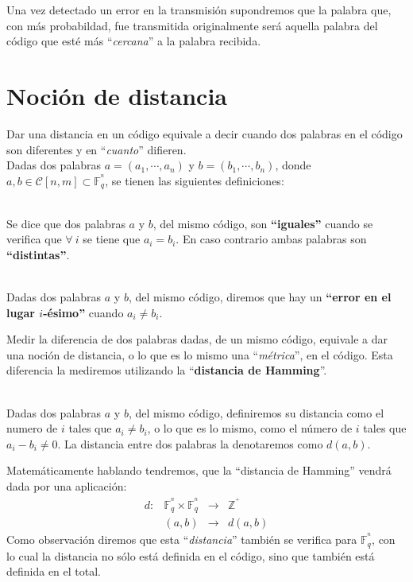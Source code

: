 Una vez detectado un error en la transmisi\'on supondremos que la palabra que,
con m\'as probabildad, fue transmitida originalmente ser\'a aquella palabra del
c\'odigo que est\'e m\'as ``\emph{cercana}'' a la palabra recibida.

%
%

\section{Noci\'on de distancia}

Dar una distancia en un c\'odigo equivale a decir cuando dos palabras en el
c\'odigo son diferentes y en ``\emph{cuanto}'' difieren.\\

Dadas dos palabras $a=(a_1,\cdots,a_n)$ y $b=(b_1,\cdots,b_n)$, donde $a,b
\in \mathcal{C}[n,m]\subset \mathbb{F}^{^n}_q$, se tienen las siguientes
definiciones:
\begin{definicion}
\ \\
Se dice que dos palabras $a$ y $b$, del mismo c\'odigo, son \textbf{``iguales''}
cuando se verifica que $\forall \ i$ se tiene que $a_i=b_i$. En caso contrario
ambas palabras son \textbf{``distintas''}.
\end{definicion}

\begin{definicion}
\ \\
Dadas dos palabras $a$ y $b$, del mismo c\'odigo, diremos que hay un
\textbf{``error en el lugar $i$-\'esimo''} cuando $a_i\neq b_i$.
\end{definicion}
Medir la diferencia de dos palabras dadas, de un mismo c\'odigo, equivale a
dar una noci\'on de distancia, o lo que es lo mismo una ``\emph{m\'etrica}'',
en el c\'odigo. Esta diferencia la mediremos utilizando la ``\textbf{distancia
de Hamming}''.
\begin{definicion}
\ \\
Dadas dos palabras $a$ y $b$, del mismo c\'odigo, definiremos su distancia como
el numero de $i$ tales que $a_i\neq b_i$, o lo que es lo mismo, como el n\'umero
de $i$ tales que $a_i-b_i \neq 0$. La distancia entre dos palabras la
denotaremos como $d(a,b)$.
\end{definicion}
Matem\'aticamente hablando tendremos, que la ``distancia de Hamming'' vendr\'a
dada por una aplicaci\'on:
\begin{displaymath}
\begin{array}{cccc}
d:&\mathbb{F}^{^n}_q\times \mathbb{F}^{^n}_q&\longrightarrow & \mathbb{Z}^{^+}\\
&(a,b)&\longrightarrow & d(a,b)
\end{array}
\end{displaymath}
Como observaci\'on diremos que esta ``\emph{distancia}'' tambi\'en se verifica
para $\mathbb{F}^{^n}_q$, con lo cual la distancia no s\'olo est\'a definida
en el c\'odigo, sino que tambi\'en est\'a definida en el total.

